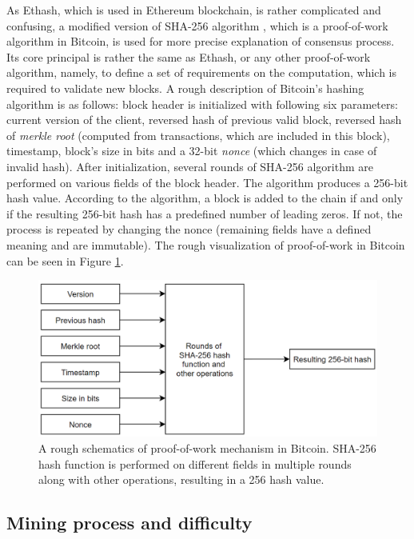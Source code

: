 As Ethash, which is used in Ethereum blockchain, is rather complicated and confusing, a modified version of SHA-256 algorithm \citep{sha256}, which is a proof-of-work algorithm in Bitcoin, is used for more precise explanation of consensus process. Its core principal is rather the same as Ethash, or any other proof-of-work algorithm, namely, to define a set of requirements on the computation, which is required to validate new blocks. A rough description of Bitcoin's hashing algorithm is as follows: block header is initialized with following six parameters: current version of the client, reversed hash of previous valid block, reversed hash of \textit{\gls{merkle root}} (computed from transactions, which are included in this block), timestamp, block's size in bits and a 32-bit \emph{\gls{nonce}} (which changes in case of invalid hash). After initialization, several rounds of SHA-256 algorithm are performed on various fields of the block header. The algorithm produces a 256-bit hash value. According to the algorithm, a block is added to the chain if and only if the resulting 256-bit hash has a predefined number of leading zeros. If not, the process is repeated by changing the nonce (remaining fields have a defined meaning and are immutable). The rough visualization of proof-of-work in Bitcoin can be seen in Figure \ref{fig:bitcoinproofofwork}.

\begin{figure}[H]
\centering
\includegraphics[scale=0.55]{images/bitcoinmining.png}
\caption{A rough schematics of proof-of-work mechanism in Bitcoin. SHA-256 hash function is performed on different fields in multiple rounds along with other operations, resulting in a 256 hash value.}
\label{fig:bitcoinproofofwork}
\end{figure}

\subsection*{Mining process and difficulty} \label{section:miningeth}

